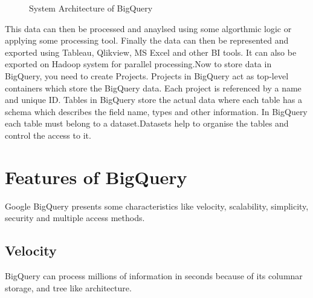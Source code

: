 \documentclass[9pt,twocolumn,twoside]{../../styles/osajnl}
\begin{document}
\begin{figure}[htbp]
\centering
{}
\caption{\cite{www-bigquery-slideshare} System Architecture of BigQuery}
\label{fig:architecture}
\end{figure}

This data can then be processed and anaylsed using some algorthmic
logic or applying some processing tool. Finally the data can then be
represented and exported using Tableau\cite{www-tableau},
Qlikview\cite{www-qlik}, MS Excel\cite{www-excel} and other BI
tools. It can also be exported on Hadoop system for parallel
processing.\newline Now to store data in BigQuery, you need to create
Projects. Projects\cite{www-bigquery-documentation} in BigQuery act as
top-level containers which store the BigQuery data. Each project is
referenced by a name and unique ID. Tables in BigQuery store the
actual data where each table has a schema which describes the field
name, types and other information. In BigQuery each table must belong
to a dataset.Datasets help to organise the tables and control the
access to it.

\noindent

\section{Features of BigQuery}
Google BigQuery presents some characteristics like
velocity, scalability, simplicity, security and multiple access
methods.

\subsection{Velocity}

BigQuery can process millions of information in seconds because of its columnar storage, and tree like architecture.
\end{document}
